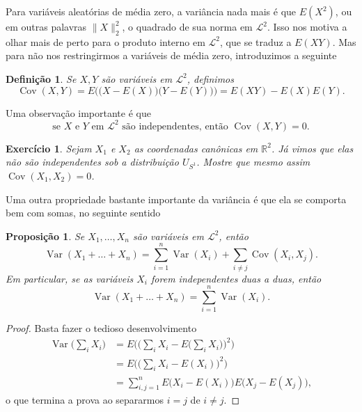 \documentclass[reqno]{article}
\newcommand*\1{\mathds{1}}
\newtheorem{proposition}[theorem]{Proposição}
\newtheorem{definition}[theorem]{Definição}
\DeclareMathOperator{\Cov}{Cov}
\DeclareMathOperator{\Var}{Var}
\newtheorem{exercise}[example]{Exercício}
\begin{document}
Para variáveis aleatórias de média zero, a variância nada mais é que $E(X^2)$, ou em outras palavras $\lVert X \rVert^2_2$, o quadrado de sua norma em $\mathcal{L}^2$.
Isso nos motiva a olhar mais de perto para o produto interno em $\mathcal{L}^2$, que se traduz a $E(XY)$.
Mas para não nos restringirmos a variáveis de média zero, introduzimos a seguinte

\begin{definition}
  Se $X, Y$ são variáveis em $\mathcal{L}^2$, definimos
  \begin{equation}
    \Cov(X,Y) = E\Big( \big(X - E(X)\big) \big(Y - E(Y)\big) \Big) = E(XY) - E(X)E(Y).
  \end{equation}
\end{definition}

Uma observação importante é que
\begin{equation}
  \text{se $X$ e $Y$ em $\mathcal{L}^2$ são independentes, então $\Cov(X,Y) = 0$.}
\end{equation}

\begin{exercise}
  Sejam $X_1$ e $X_2$ as coordenadas canônicas em $\mathbb{R}^2$.
  Já vimos que elas não são independentes sob a distribuição $U_{S^1}$.
  Mostre que mesmo assim $\Cov(X_1, X_2) = 0$.
\end{exercise}

Uma outra propriedade bastante importante da variância é que ela se comporta bem com somas, no seguinte sentido
\begin{proposition}
  Se $X_1, \dots, X_n$ são variáveis em $\mathcal{L}^2$, então
  \begin{equation}
    \Var(X_1 + \dots + X_n) = \sum_{i=1}^n \Var(X_i) + \sum_{i \neq j} \Cov(X_i, X_j).
  \end{equation}
  Em particular, se as variáveis $X_i$ forem independentes duas a duas, então
  \begin{equation}
    \Var(X_1 + \dots + X_n) = \sum_{i=1}^n \Var(X_i).
  \end{equation}
\end{proposition}

\begin{proof}
  Basta fazer o tedioso desenvolvimento
  \begin{equation}
    \begin{split}
      \Var\Big(\sum_i X_i\Big) & = E \Big( \Big(\sum_i X_i - E\Big(\sum_i X_i\Big)\Big)^2\Big)\\
      & = E \Big( \Big(\sum_i X_i - E(X_i)\Big)^2\Big)\\
      & = \sum_{i, j = 1}^n E \big(X_i - E(X_i)\big) E\big(X_j - E(X_j)\big),
    \end{split}
  \end{equation}
  o que termina a prova ao separarmos $i = j$ de $i \neq j$.
\end{proof}
\end{document}
